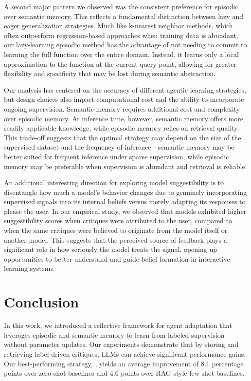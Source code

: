 A second major pattern we observed was the consistent preference for episodic over semantic memory. This reflects a fundamental distinction between lazy and eager generalization strategies. Much like k-nearest neighbor methods, which often outperform regression-based approaches when training data is abundant, our lazy-learning episodic method has the advantage of not needing to commit to learning the full function over the entire domain. Instead, it learns only a local approximation to the function at the current query point, allowing for greater flexibility and specificity that may be lost during semantic abstraction.

Our analysis has centered on the accuracy of different agentic learning strategies, but design choices also impact computational cost and the ability to incorporate ongoing supervision. Semantic memory requires additional cost and complexity over episodic memory. At inference time, however, semantic memory offers more readily applicable knowledge, while episodic memory relies on retrieval quality. This trade-off suggests that the optimal strategy may depend on the size of the supervised dataset and the frequency of inference---semantic memory may be better suited for frequent inference under sparse supervision, while episodic memory may be preferable when supervision is abundant and retrieval is reliable.

An additional interesting direction for exploring model suggestibility is to disentangle how much a model's behavior changes due to genuinely incorporating supervised signals into its internal beliefs versus merely adapting its responses to please the user. In our empirical study, we observed that models exhibited higher suggestibility scores when critiques were attributed to the user, compared to when the same critiques were believed to originate from the model itself or another model. This suggests that the perceived source of feedback plays a significant role in how seriously the model treats the signal, opening up opportunities to better understand and guide belief formation in interactive learning systems.

\section{Conclusion}

In this work, we introduced a reflective framework for agent adaptation that leverages episodic and semantic memory to learn from labeled supervision without parameter updates. Our experiments demonstrate that by storing and retrieving label-driven critiques, LLMs can achieve significant performance gains. Our best-performing strategy, \EPSEMCRIT, yields an average improvement of 8.1 percentage points over zero-shot baselines and 4.6 points over RAG-style few-shot baselines.


